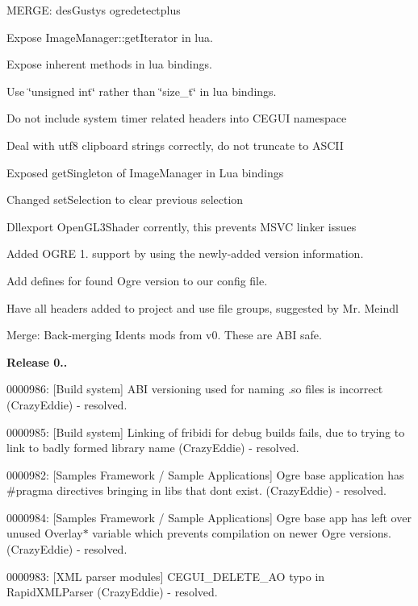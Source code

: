 \begin{DoxyItemize}
\item M\+E\+R\+GE\+: des\+Gusty\textquotesingle{}s ogredetectplus
\item Expose Image\+Manager\+::get\+Iterator in lua.
\item Expose inherent methods in lua bindings.
\item Use \char`\"{}unsigned int\char`\"{} rather than \char`\"{}size\+\_\+t\char`\"{} in lua bindings.
\item Do not include system timer related headers into C\+E\+G\+UI namespace
\item Deal with utf8 clipboard strings correctly, do not truncate to A\+S\+C\+II
\item Exposed \textquotesingle{}get\+Singleton\textquotesingle{} of Image\+Manager in Lua bindings
\item Changed set\+Selection to clear previous selection
\item Dllexport Open\+G\+L3\+Shader corrently, this prevents M\+S\+VC linker issues
\item Added O\+G\+RE 1. support by using the newly-\/added version information.
\item Add defines for found Ogre version to our config file.
\item Have all headers added to project and use file groups, suggested by Mr. Meindl
\item Merge\+: Back-\/merging Ident\textquotesingle{}s mods from v0. These are A\+BI safe.
\end{DoxyItemize}

{\bfseries{Release 0..}}
\begin{DoxyItemize}
\item 0000986\+: \mbox{[}Build system\mbox{]} A\+BI versioning used for naming .so files is incorrect (Crazy\+Eddie) -\/ resolved.
\item 0000985\+: \mbox{[}Build system\mbox{]} Linking of fribidi for debug builds fails, due to trying to link to badly formed library name (Crazy\+Eddie) -\/ resolved.
\item 0000982\+: \mbox{[}Samples Framework / Sample Applications\mbox{]} Ogre base application has \#pragma directives bringing in libs that don\textquotesingle{}t exist. (Crazy\+Eddie) -\/ resolved.
\item 0000984\+: \mbox{[}Samples Framework / Sample Applications\mbox{]} Ogre base app has left over unused Overlay$\ast$ variable which prevents compilation on newer Ogre versions. (Crazy\+Eddie) -\/ resolved.
\item 0000983\+: \mbox{[}X\+ML parser modules\mbox{]} C\+E\+G\+U\+I\+\_\+\+D\+E\+L\+E\+T\+E\+\_\+\+AO typo in Rapid\+X\+M\+L\+Parser (Crazy\+Eddie) -\/ resolved.
\end{DoxyItemize}

